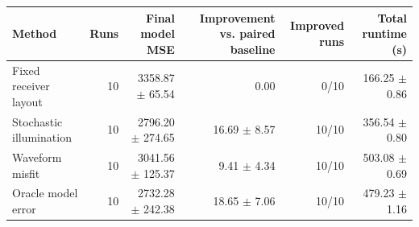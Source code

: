 \begin{tabular}{lrrrrr}
\toprule
Method & Runs & Final model MSE & Improvement vs. paired baseline & Improved runs & Total runtime (s) \\
\midrule
Fixed receiver layout & 10 & 3358.87 $\pm$ 65.54 & 0.00 & 0/10 & 166.25 $\pm$ 0.86 \\
Stochastic illumination & 10 & 2796.20 $\pm$ 274.65 & 16.69 $\pm$ 8.57 & 10/10 & 356.54 $\pm$ 0.80 \\
Waveform misfit & 10 & 3041.56 $\pm$ 125.37 & 9.41 $\pm$ 4.34 & 10/10 & 503.08 $\pm$ 0.69 \\
Oracle model error & 10 & 2732.28 $\pm$ 242.38 & 18.65 $\pm$ 7.06 & 10/10 & 479.23 $\pm$ 1.16 \\
\bottomrule
\end{tabular}

